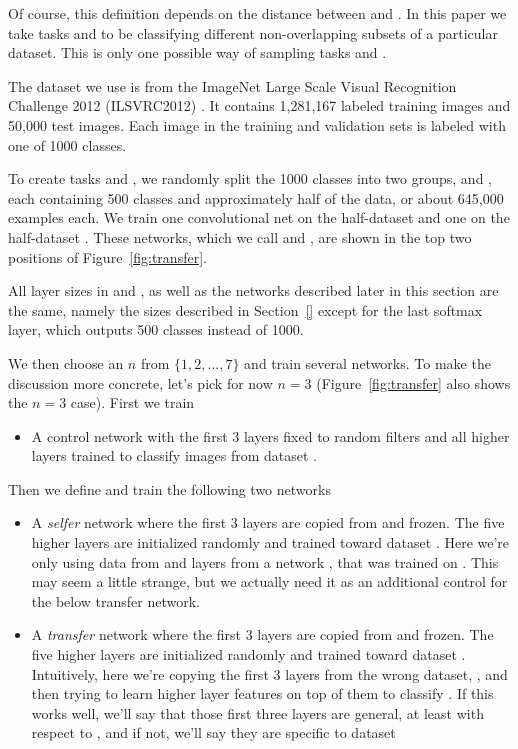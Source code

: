 Of course, this definition depends on the distance between \dA and \dB. In this paper we take tasks \dA and \dB to be classifying different non-overlapping subsets of a particular dataset.   This is only one possible way of sampling tasks \dA and \dB.

The dataset we use is from the ImageNet Large Scale Visual Recognition Challenge 2012 (ILSVRC2012) \citep{imagenet_cvpr09}. It contains 1,281,167 labeled training images and 50,000 test images. Each image in the training and validation sets is labeled with one of 1000 classes.

To create tasks \dA and \dB, we randomly split the 1000 classes into two groups, \dA and \dB, each containing 500 classes and approximately half of the data, or about 645,000 examples each. We train one convolutional net on the half-dataset \dA and one on the half-dataset \dB. These networks, which we call  and , are shown in the top two positions of Figure~\ref{fig:transfer}.

All layer sizes in  and , as well as the networks described later in this section are the same, namely the sizes described in Section~\ref{} except for the last softmax layer, which outputs 500 classes instead of 1000.


We then choose an $n$ from $\{1, 2, \ldots, 7\}$ and train several networks. To make the discussion more concrete, let's pick for now $n=3$ (Figure~\ref{fig:transfer} also shows the $n=3$ case). First we train 

\begin{itemize}
\item A control network  with the first $3$ layers fixed to random filters and all higher layers trained to classify images from dataset \dB.
\end{itemize}

Then we define and train the following two networks

\begin{itemize}
\item A \emph{selfer} network  where the first $3$ layers are copied from  and frozen. The five higher layers are initialized randomly and trained toward dataset \dB. Here we're only using data from \dB and layers from a network , that was trained on \dB. This may seem a little strange, but we actually need it as an additional control for the below transfer network.

\item A \emph{transfer} network  where the first $3$ layers are copied from  and frozen. The five higher layers are initialized randomly and trained toward dataset \dB. Intuitively, here we're copying the first $3$ layers from the wrong dataset, \dA,  and then trying to learn higher layer features on top of them to classify \dB. If this works well, we'll say that those first three layers are general, at least with respect to \dB, and if not, we'll say they are specific to dataset \dA
\end{itemize}


